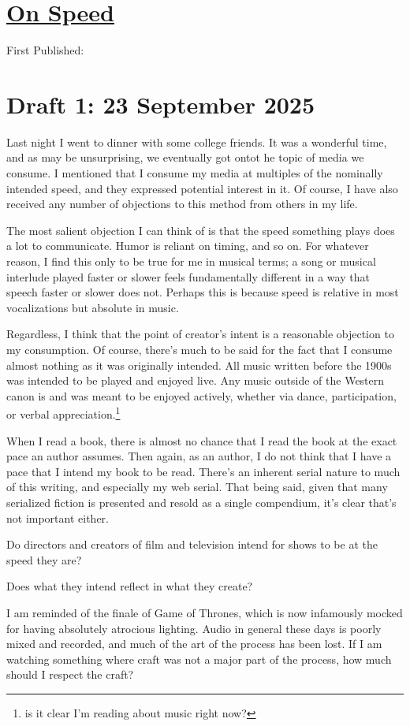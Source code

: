 \documentclass[12pt]{article}
\renewcommand{\,}{\textsuperscript{,}}
\begin{document}
  
\doublespacing  
\section{\href{speed.html}{On Speed}}  
First Published: 
\section{Draft 1: 23 September 2025}
Last night I went to dinner with some college friends.
It was a wonderful time, and as may be unsurprising, we eventually got ontot he topic of media we consume.
I mentioned that I consume my media at multiples of the nominally intended speed, and they expressed potential interest in it.
Of course, I have also received any number of objections to this method from others in my life.

The most salient objection I can think of is that the speed something plays does a lot to communicate.
Humor is reliant on timing, and so on.
For whatever reason, I find this only to be true for me in musical terms; a song or musical interlude played faster or slower feels fundamentally different in a way that speech faster or slower does not.
Perhaps this is because speed is relative in most vocalizations but absolute in music.

Regardless, I think that the point of creator's intent is a reasonable objection to my consumption.
Of course, there's much to be said for the fact that I consume almost nothing as it was originally intended.
All music written before the 1900s was intended to be played and enjoyed live.
Any music outside of the Western canon is and was meant to be enjoyed actively, whether via dance, participation, or verbal appreciation.\footnote{is it clear I'm reading about music right now?}

When I read a book, there is almost no chance that I read the book at the exact pace an author assumes.
Then again, as an author, I do not think that I have a pace that I intend my book to be read.
There's an inherent serial nature to much of this writing, and especially my web serial.
That being said, given that many serialized fiction is presented and resold as a single compendium, it's clear that's not important either.

Do directors and creators of film and television intend for shows to be at the speed they are?

Does what they intend reflect in what they create?

I am reminded of the finale of Game of Thrones, which is now infamously mocked for having absolutely atrocious lighting.
Audio in general these days is poorly mixed and recorded, and much of the art of the process has been lost.
If I am watching something where craft was not a major part of the process, how much should I respect the craft?
\end{document}

